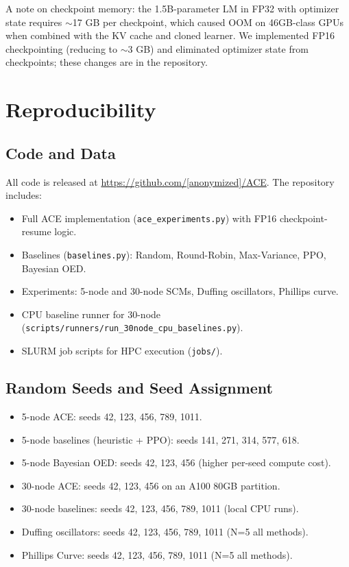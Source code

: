 A note on checkpoint memory: the 1.5B-parameter LM in FP32 with optimizer state requires $\sim$17 GB per checkpoint, which caused OOM on 46GB-class GPUs when combined with the KV cache and cloned learner. We implemented FP16 checkpointing (reducing to $\sim$3 GB) and eliminated optimizer state from checkpoints; these changes are in the repository.

\section{Reproducibility}
\label{app:reproducibility}

\subsection{Code and Data}

All code is released at \url{https://github.com/[anonymized]/ACE}. The repository includes:
\begin{itemize}[leftmargin=1.2em,topsep=0.2em,itemsep=0.1em]
\item Full ACE implementation (\texttt{ace\_experiments.py}) with FP16 checkpoint-resume logic.
\item Baselines (\texttt{baselines.py}): Random, Round-Robin, Max-Variance, PPO, Bayesian OED.
\item Experiments: 5-node and 30-node SCMs, Duffing oscillators, Phillips curve.
\item CPU baseline runner for 30-node (\texttt{scripts/runners/run\_30node\_cpu\_baselines.py}).
\item SLURM job scripts for HPC execution (\texttt{jobs/}).
\end{itemize}

\subsection{Random Seeds and Seed Assignment}

\begin{itemize}[leftmargin=1.2em,topsep=0.2em,itemsep=0.1em]
\item 5-node ACE: seeds 42, 123, 456, 789, 1011.
\item 5-node baselines (heuristic + PPO): seeds 141, 271, 314, 577, 618.
\item 5-node Bayesian OED: seeds 42, 123, 456 (higher per-seed compute cost).
\item 30-node ACE: seeds 42, 123, 456 on an A100 80GB partition.
\item 30-node baselines: seeds 42, 123, 456, 789, 1011 (local CPU runs).
\item Duffing oscillators: seeds 42, 123, 456, 789, 1011 (N=5 all methods).
\item Phillips Curve: seeds 42, 123, 456, 789, 1011 (N=5 all methods).
\end{itemize}

